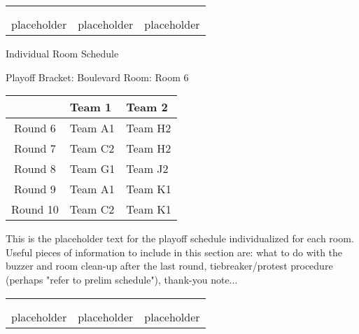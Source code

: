 \documentclass{article}%
\begin{document}
%
\begin{tabularx}{\textwidth}{YYY}%
  &  &  \\%
\\%
placeholder&placeholder&placeholder\\%
\end{tabularx}%
\newpage%
\begin{center}%
\begin{Huge}%
Individual Room Schedule%
\end{Huge}%
\vspace*{16pt}%
\linebreak%
\begin{Large}%
Playoff Bracket: Boulevard \hfill Room: Room 6%
\end{Large}%
\end{center}%
%
\begin{tabularx}{\textwidth}{|c|Y|Y|}%
\hline%
&Team 1&Team 2\\%
\hline%
Round 6&Team A1&Team H2\\%
Round 7&Team C2&Team H2\\%
Round 8&Team G1&Team J2\\%
Round 9&Team A1&Team K1\\%
Round 10&Team C2&Team K1\\%
\hline%
\end{tabularx}%
\vspace*{16pt}%
\linebreak%
This is the placeholder text for the playoff schedule individualized for each room. Useful pieces of information to include in this section are: what to do with the buzzer and room clean{-}up after the last round, tiebreaker/protest procedure (perhaps "refer to prelim schedule"), thank{-}you note...%
\vspace*{30pt}%
\newline%
%
\begin{tabularx}{\textwidth}{YYY}%
  &  &  \\%
\\%
placeholder&placeholder&placeholder\\%
\end{tabularx}%
\end{document}
